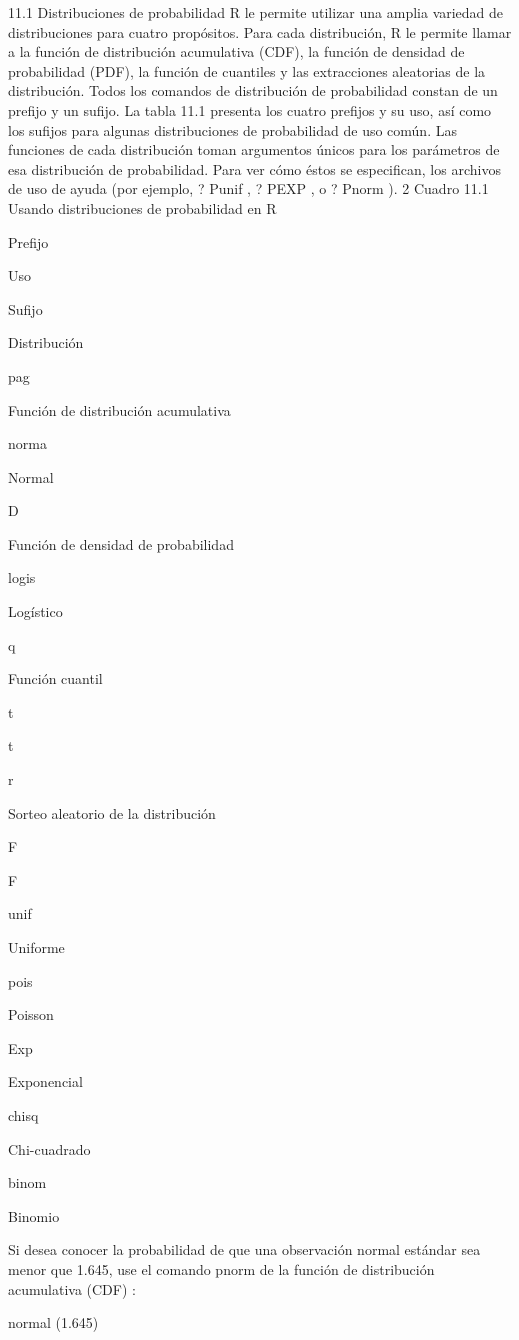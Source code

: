 \documentclass[
]{book}
\begin{document}
11.1 Distribuciones de probabilidad
R le permite utilizar una amplia variedad de distribuciones para cuatro propósitos. Para cada distribución, R le permite llamar a la función de distribución acumulativa (CDF), la función de densidad de probabilidad (PDF), la función de cuantiles y las extracciones aleatorias de la distribución. Todos los comandos de distribución de probabilidad constan de un prefijo y un sufijo. La tabla 11.1 presenta los cuatro prefijos y su uso, así como los sufijos para algunas distribuciones de probabilidad de uso común. Las funciones de cada distribución toman argumentos únicos para los parámetros de esa distribución de probabilidad. Para ver cómo éstos se especifican, los archivos de uso de ayuda (por ejemplo, ? Punif , ? PEXP , o ? Pnorm ). 2
Cuadro 11.1
Usando distribuciones de probabilidad en R

Prefijo

Uso

Sufijo

Distribución

pag

Función de distribución acumulativa

norma

Normal

D

Función de densidad de probabilidad

logis

Logístico

q

Función cuantil

t

t

r

Sorteo aleatorio de la distribución

F

F

unif

Uniforme

pois

Poisson

Exp

Exponencial

chisq

Chi-cuadrado

binom

Binomio

Si desea conocer la probabilidad de que una observación normal estándar sea menor que 1.645, use el comando pnorm de la función de distribución acumulativa (CDF) :

normal (1.645)
\end{document}
